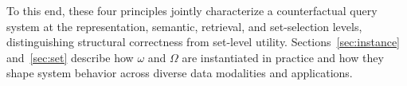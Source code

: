 \smallskip\noindent To this end, these four principles jointly characterize a counterfactual query system at the representation, semantic, retrieval, and set-selection levels, distinguishing structural correctness from set-level utility. Sections~\ref{sec:instance} and~\ref{sec:set} describe how $\omega$ and $\Omega$ are instantiated in practice and how they shape system behavior across diverse data modalities and applications.